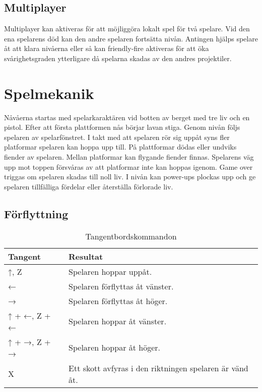 \documentclass{TDP005mall}
\begin{document}
\subsection{Multiplayer}
Multiplayer kan aktiveras för att möjliggöra lokalt spel för två spelare. Vid den ena spelarens död kan den andre spelaren fortsätta nivån. Antingen hjälps spelare åt att klara nivåerna eller så kan friendly-fire aktiveras för att öka svårighetsgraden ytterligare då spelarna skadas av den andres projektiler.

\section{Spelmekanik}%
Nåvåerna startas med spelarkaraktären vid botten av berget med tre liv och en pistol. Efter att första plattformen nås börjar lavan stiga. Genom nivån följs spelaren av spelarfönstret. I takt med att spelaren rör sig uppåt syns fler platformar spelaren kan hoppa upp till. På plattformar dödas eller undviks fiender av spelaren. Mellan platformar kan flygande fiender finnas. Spelarens väg upp mot toppen försvåras av att platformar inte kan hoppas igenom. Game over triggas om spelaren skadas till noll liv. I nivån kan power-ups plockas upp och ge spelaren tillfälliga fördelar eller återställa förlorade liv. 

\subsection{Förflyttning} %

\begin{table}[h!]
  \caption{Tangentbordskommandon\label{tab:1}}
\begin{tabular}{|l|l|}
\hline
Tangent & Resultat \\\hline
↑, Z & Spelaren hoppar uppåt. \\\hline
← & Spelaren förflyttas åt vänster. \\\hline
→ & Spelaren förflyttas åt höger. \\\hline
↑ + ←, Z + ← & Spelaren hoppar åt vänster. \\\hline
↑ + →, Z + → & Spelaren hoppar åt höger. \\\hline
X & Ett skott avfyras i den riktningen spelaren är vänd åt. \\\hline
\end{tabular}
\end{table}
\end{document}
